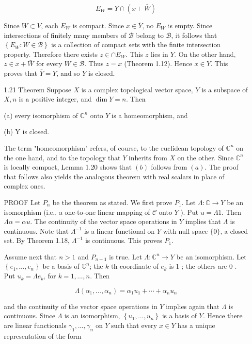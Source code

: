 \documentclass[10pt]{article}
\begin{document}
$$
E_{W}=Y \cap(x+\bar{W})
$$

Since $W \subset V$, each $E_{W}$ is compact. Since $x \in \bar{Y}$, no $E_{W}$ is empty. Since intersections of finitely many members of $\mathscr{B}$ belong to $\mathscr{B}$, it follows that $\left\{E_{W}: W \in \mathscr{B}\right\}$ is a collection of compact sets with the finite intersection property. Therefore there exists $z \in \cap E_{W}$. This $z$ lies in $Y$. On the other hand, $z \in x+\bar{W}$ for every $W \in \mathscr{B}$. Thus $z=x$ (Theorem 1.12). Hence $x \in Y$. This proves that $\bar{Y}=Y$, and so $Y$ is closed.

1.21 Theorem Suppose $X$ is a complex topological vector space, $Y$ is a subspace of $X, n$ is a positive integer, and $\operatorname{dim} Y=n$. Then

(a) every isomorphism of $\mathbb{C}^{n}$ onto $Y$ is a homeomorphism, and

(b) Y is closed.

The term "homeomorphism" refers, of course, to the euclidean topology of $\mathbb{C}^{n}$ on the one hand, and to the topology that $Y$ inherits from $X$ on the other. Since $\mathbb{C}^{n}$ is locally compact, Lemma 1.20 shows that $(b)$ follows from $(a)$. The proof that follows also yields the analogous theorem with real scalars in place of complex ones.

PROOF Let $P_{n}$ be the theorem as stated. We first prove $P_{1}$. Let $\Lambda: \mathbb{C} \rightarrow Y$ be an isomorphism (i.e., a one-to-one linear mapping of $\mathscr{C}$ onto $Y$ ). Put $u=\Lambda 1$. Then $\Lambda \alpha=\alpha u$. The continuity of the vector space operations in $Y$ implies that $\Lambda$ is continuous. Note that $\Lambda^{-1}$ is a linear functional on $Y$ with null space $\{0\}$, a closed set. By Theorem 1.18, $\Lambda^{-1}$ is continuous. This proves $P_{1}$.

Assume next that $n>1$ and $P_{n-1}$ is true. Let $\Lambda: \mathbb{C}^{n} \rightarrow Y$ be an isomorphism. Let $\left\{e_{1}, \ldots, e_{n}\right\}$ be a basis of $\mathbb{C}^{n}$; the $k$ th coordinate of $e_{k}$ is 1 ; the others are 0 . Put $u_{k}=\Lambda e_{k}$, for $k=1, \ldots, n$. Then

$$
\Lambda\left(\alpha_{1}, \ldots, \alpha_{n}\right)=\alpha_{1} u_{1}+\cdots+\alpha_{n} u_{n}
$$

and the continuity of the vector space operations in $Y$ implies again that $\Lambda$ is continuous. Since $\Lambda$ is an isomorphism, $\left\{u_{1}, \ldots, u_{n}\right\}$ is a basis of $Y$. Hence there are linear functionals $\gamma_{1}, \ldots, \gamma_{n}$ on $Y$ such that every $x \in Y$ has a unique representation of the form
\end{document}
